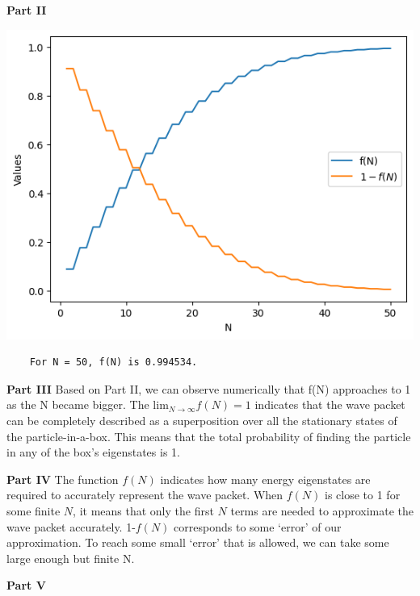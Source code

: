 \documentclass{article}
\begin{document}
\begin{adjustwidth}{5pt}{5pt}
    
\vspace{0.2cm}
\item[] \textbf{Part II}

\includegraphics[width=0.5\linewidth]{2-b-iii.png}
\begin{lstlisting}
    For N = 50, f(N) is 0.994534.
\end{lstlisting}
\vspace{0.2cm}
\item[] \textbf{Part III} Based on Part II, we can observe numerically that f(N) approaches to 1 as the N became bigger. The $\mathrm{lim}_{N \rightarrow \infty} f(N) = 1$ indicates that the wave packet can be completely described as a superposition over all the stationary states of the particle-in-a-box. This means that the total probability of finding the particle in any of the box's eigenstates is 1.
\vspace{0.2cm}
\item[] \textbf{Part IV} The function $f(N)$ indicates how many energy eigenstates are required to accurately represent the wave packet. When $f(N)$ is close to 1 for some finite $N$, it means that only the first $N$ terms are needed to approximate the wave packet accurately. 1-$f(N)$ corresponds to some `error' of our approximation. To reach some small `error' that is allowed, we can take some large enough but finite N.\\
\vspace{0.2cm}
\item[] \textbf{Part V} \\


\end{adjustwidth}
\end{document}

